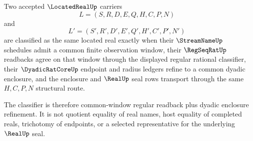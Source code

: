 \begin{definition}
\label{def:located-real-classifier}
Two accepted $\LocatedRealUp$ carriers
$$
L=(S,R,D,E,Q,H,C,P,N)
$$
and
$$
L'=(S',R',D',E',Q',H',C',P',N')
$$
are classified as the same located real exactly when their $\StreamNameUp$ schedules admit a common finite observation window, their $\RegSeqRatUp$ readbacks agree on that window through the displayed regular rational classifier, their $\DyadicRatCoreUp$ endpoint and radius ledgers refine to a common dyadic enclosure, and the enclosure and $\RealUp$ seal rows transport through the same $H,C,P,N$ structural route.

The classifier is therefore common-window regular readback plus dyadic enclosure refinement. It is not quotient equality of real names, host equality of completed reals, trichotomy of endpoints, or a selected representative for the underlying $\RealUp$ seal.
\end{definition}

